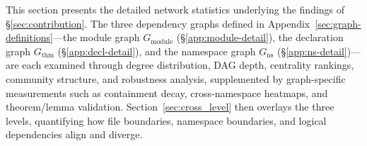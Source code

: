 \documentclass[10pt]{article}
\begin{document}
This section presents the detailed network statistics underlying the findings of \S\ref{sec:contribution}. The three dependency graphs defined in Appendix~\ref{sec:graph-definitions}---the module graph $G_{\mathrm{module}}$ (\S\ref{app:module-detail}), the declaration graph $G_{\mathrm{thm}}$ (\S\ref{app:decl-detail}), and the namespace graph $G_{\mathrm{ns}}$ (\S\ref{app:ns-detail})---are each examined through degree distribution, DAG depth, centrality rankings, community structure, and robustness analysis, supplemented by graph-specific measurements such as containment decay, cross-namespace heatmaps, and theorem/lemma validation. Section~\ref{sec:cross_level} then overlays the three levels, quantifying how file boundaries, namespace boundaries, and logical dependencies align and diverge.





\end{document}
